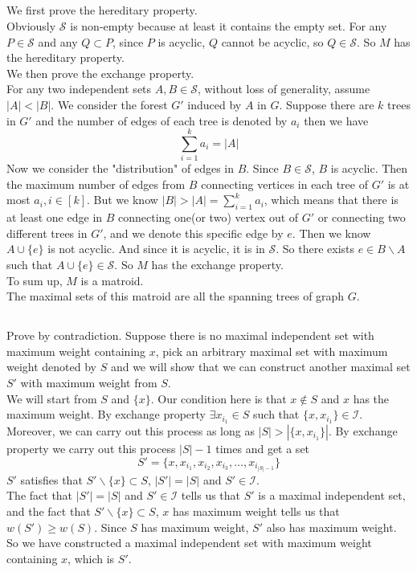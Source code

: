 \documentclass[12pt,letterpaper]{article}
\begin{document}
\subsection{}
We first prove the hereditary property.\\
Obviously $\mathcal{S}$ is non-empty because at least it contains the empty set.
For any $P\in\mathcal{S}$ and any $Q\subset P$, since $P$ is acyclic, $Q$ cannot be acyclic,
so $Q\in\mathcal{S}$. So $M$ has the hereditary property.\\
\newline
We then prove the exchange property.\\
For any two independent sets $A,B\in\mathcal{S}$, without loss of generality, assume $|A|<|B|$.
We consider the forest $G'$ induced by $A$ in $G$.
Suppose there are $k$ trees in $G'$ and the number of edges of each tree is denoted by $a_i$
then we have 
$$\sum_{i=1}^ka_i=|A|$$
Now we consider the "distribution" of edges in $B$.
Since $B\in\mathcal{S}$, $B$ is acyclic.
Then the maximum number of edges from $B$ connecting vertices in each tree of $G'$ is at most $a_i,i\in[k]$.
But we know $|B|>|A|=\sum_{i=1}^ka_i$, 
which means that there is at least one edge in $B$ connecting one(or two) vertex out of $G'$ or
connecting two different trees in $G'$, and we denote this specific edge by $e$. 
Then we know $A\cup\{e\}$ is not acyclic. 
And since it is acyclic, it is in $\mathcal{S}$. 
So there exists $e\in B\backslash A$ such that $A\cup\{e\}\in\mathcal{S}$.
So $M$ has the exchange property.\\
To sum up, $M$ is a matroid.\\
The maximal sets of this matroid are all the spanning trees of graph $G$.

\subsection{}
Prove by contradiction. Suppose there is no maximal independent set with maximum weight containing $x$,
pick an arbitrary maximal set with maximum weight denoted by $S$ and we will show that we can construct another maximal set $S'$ with maximum weight from $S$.\\
We will start from $S$ and $\{x\}$. Our condition here is that $x\notin S$ and $x$ has the maximum weight.
By exchange property $\exists x_{i_1}\in S$ such that $\{x,x_{i_1}\}\in\mathcal{I}$.
Moreover, we can carry out this process as long as $|S|>|\{x,x_{i_1}\}|$.
By exchange property we carry out this process $|S|-1$ times and get a set 
$$S'=\{x,x_{i_1},x_{i_2},x_{i_3},\dots,x_{i_{|S|-1}}\}$$
$S'$ satisfies that $S'\backslash\{x\}\subset S$, $|S'|=|S|$ and $S'\in\mathcal{I}$.\\
The fact that $|S'|=|S|$ and $S'\in\mathcal{I}$ tells us that $S'$ is a maximal independent set, 
and the fact that $S'\backslash\{x\}\subset S$, $x$ has maximum weight tells us that $w(S')\geq w(S)$.
Since $S$ has maximum weight, $S'$ also has maximum weight. 
So we have constructed a maximal independent set with maximum weight containing $x$,
which is $S'$.
\end{document}

